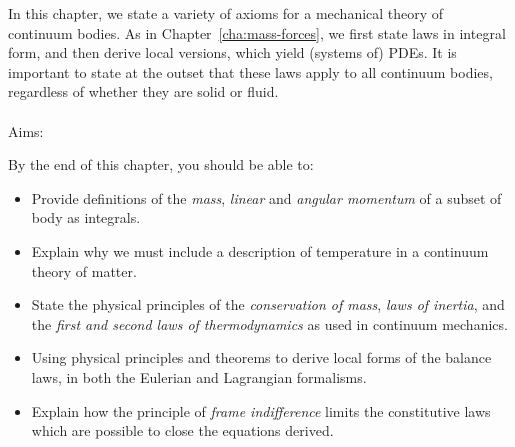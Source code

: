 \documentclass[
  letterpaper,
  DIV=11,
  numbers=noendperiod]{scrreprt}
\makeatletter
\let\oldparagraph\paragraph
\renewcommand{\paragraph}{
    \@ifstar
      \xxxParagraphStar
      \xxxParagraphNoStar
  }
\newcommand{\xxxParagraphStar}[1]{\oldparagraph*{#1}\mbox{}}
\newcommand{\xxxParagraphNoStar}[1]{\oldparagraph{#1}\mbox{}}
\theoremstyle{plain}
\theoremstyle{remark}
\makeatother
\begin{document}
\newcommand{\bftau}{{\boldsymbol{\tau}}}
\newcommand{\bfnu}{{\boldsymbol{\nu}}}
\newcommand{\bfpsi}{{\boldsymbol{\psi}}}
\newcommand{\bfphi}{{\boldsymbol{\varphi}}}
\newcommand{\bfSigma}{{\boldsymbol{\Sigma}}}
\newcommand{\calI}{{\mathcal{I}}}
\newcommand{\calN}{{\mathcal{N}}}
\newcommand{\calV}{{\mathcal{V}}}
\newcommand{\bbE}{{\mathbb{E}}}
\newcommand{\bbR}{{\mathbb{R}}}
\newcommand{\bbC}{{\mathbb{C}}}
\newcommand{\bsfC}{{\mathsf{C}}}
\newcommand{\bsfD}{{\mathsf{D}}}
\newcommand{\bsfI}{{\mathsf{I}}}
\newcommand{\bsfO}{{\mathsf{O}}}
\newcommand{\tr}{{\operatorname{tr}}}
\newcommand{\sym}{{\operatorname{sym}}}
\newcommand{\skw}{{\operatorname{skew}}}
\newcommand{\vc}{{\operatorname{vec}}}
\newcommand{\ten}{{\operatorname{ten}}}
\newcommand{\cof}{{\operatorname{cof}}}
\newcommand{\mass}{{\operatorname{mass}}}
\newcommand{\vol}{{\operatorname{vol}}}
\newcommand{\area}{{\operatorname{area}}}
\newcommand{\com}{{\operatorname{com}}}
\newcommand{\cov}{{\operatorname{cov}}}
\newcommand{\e}{{\mathrm{e}}}
\newcommand{\D}{{\mathrm{D}}}
\newcommand{\dd}{{\mathrm{d}}}
\newcommand{\dt}{{\dd t}}
\newcommand{\Dt}{{\D t}}
\newcommand{\bigO}{{O}}
\newcommand{\litO}{{o}}
\newcommand{\dVx}{{\,\d V_{\bfx}}}
\newcommand{\dAx}{{\,\d A_{\bfx}}}
\newcommand{\dVy}{{\,\d V_{\bfy}}}
\newcommand{\dAy}{{\,\d A_{\bfy}}}
\newcommand{\ds}{{\,\d s}}

In this chapter, we state a variety of axioms for a mechanical theory of
continuum bodies. As in
Chapter~\hyperref[cha:mass-forces]{{[}cha:mass-forces{]}}, we first
state laws in integral form, and then derive local versions, which yield
(systems of) PDEs. It is important to state at the outset that these
laws apply to all continuum bodies, regardless of whether they are solid
or fluid.

\paragraph{Aims:}\label{aims}

By the end of this chapter, you should be able to:

\begin{itemize}
\item
  Provide definitions of the \emph{mass}, \emph{linear} and
  \emph{angular momentum} of a subset of body as integrals.
\item
  Explain why we must include a description of temperature in a
  continuum theory of matter.
\item
  State the physical principles of the \emph{conservation of mass},
  \emph{laws of inertia}, and the \emph{first and second laws of
  thermodynamics} as used in continuum mechanics.
\item
  Using physical principles and theorems to derive local forms of the
  balance laws, in both the Eulerian and Lagrangian formalisms.
\item
  Explain how the principle of \emph{frame indifference} limits the
  constitutive laws which are possible to close the equations derived.
\end{itemize}
\end{document}
